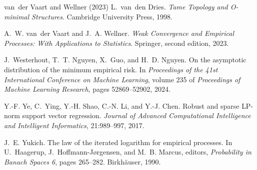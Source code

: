 \documentclass[11pt]{article}
\begin{document}
\begin{thebibliography}{van~der Vaart and Wellner (2023)}
 L.~van~den Dries. \newblock
\emph{Tame Topology and O-minimal Structures}. \newblock Cambridge
University Press, 1998.

 A.~W. van~der
Vaart and J.~A. Wellner. \newblock \emph{Weak Convergence and Empirical
Processes: With Applications to Statistics}. \newblock Springer,
second edition, 2023.

J.~Westerhout, T.~T. Nguyen, X.~Guo, and H.~D. Nguyen. \newblock
On the asymptotic distribution of the minimum empirical risk. \newblock
In \emph{Proceedings of the 41st International Conference on Machine
Learning}, volume 235 of \emph{Proceedings of Machine Learning Research},
pages 52869--52902, 2024.

Y.-F. Ye, C.~Ying, Y.-H. Shao, C.-N. Li, and Y.-J. Chen. \newblock
Robust and sparse {LP}-norm support vector regression. \newblock
\emph{Journal of Advanced Computational Intelligence and Intelligent
Informatics}, 21:989--997, 2017.

 J.~E. Yukich. \newblock The
law of the iterated logarithm for empirical processes. \newblock
In U.~Haagerup, J.~Hoffmann-Jørgensen, and M.~B. Marcus, editors,
\emph{Probability in Banach Spaces 6}, pages 265--282. Birkhäuser,
1990.

\end{thebibliography}
\end{document}
